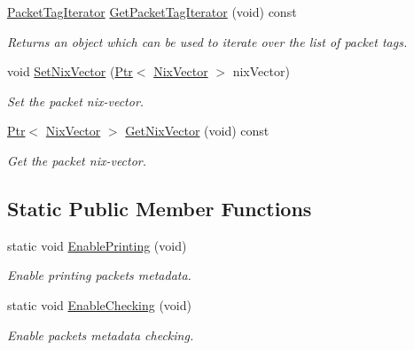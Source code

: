 \begin{DoxyCompactItemize}
\hyperlink{classns3_1_1PacketTagIterator}{Packet\+Tag\+Iterator} \hyperlink{classns3_1_1Packet_a9a06a61555a35fcad20638e6a7dfbeaa}{Get\+Packet\+Tag\+Iterator} (void) const 
\begin{DoxyCompactList}\small\item\em Returns an object which can be used to iterate over the list of packet tags. \end{DoxyCompactList}\item 
void \hyperlink{classns3_1_1Packet_a7e02c5b608a578c845aafd838f155989}{Set\+Nix\+Vector} (\hyperlink{classns3_1_1Ptr}{Ptr}$<$ \hyperlink{classns3_1_1NixVector}{Nix\+Vector} $>$ nix\+Vector)
\begin{DoxyCompactList}\small\item\em Set the packet nix-\/vector. \end{DoxyCompactList}\item 
\hyperlink{classns3_1_1Ptr}{Ptr}$<$ \hyperlink{classns3_1_1NixVector}{Nix\+Vector} $>$ \hyperlink{classns3_1_1Packet_a3d68d7d2738678185315b59640848819}{Get\+Nix\+Vector} (void) const 
\begin{DoxyCompactList}\small\item\em Get the packet nix-\/vector. \end{DoxyCompactList}\end{DoxyCompactItemize}
\subsection*{Static Public Member Functions}
\begin{DoxyCompactItemize}
\item 
static void \hyperlink{classns3_1_1Packet_ae17c0cd8e63e83df3c9273801e3d5d7f}{Enable\+Printing} (void)
\begin{DoxyCompactList}\small\item\em Enable printing packets metadata. \end{DoxyCompactList}\item 
static void \hyperlink{classns3_1_1Packet_abf6564e3496f2b8852774c98bd839b85}{Enable\+Checking} (void)
\begin{DoxyCompactList}\small\item\em Enable packets metadata checking. \end{DoxyCompactList}\end{DoxyCompactItemize}

